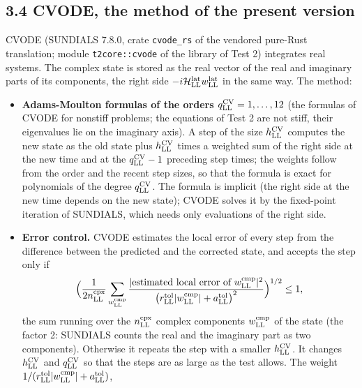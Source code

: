 \documentclass[
  10pt,
]{article}
\providecommand{\tightlist}{%
  \setlength{\itemsep}{0pt}\setlength{\parskip}{0pt}}
\begin{document}
\hypertarget{cvode-the-method-of-the-present-version}{%
\subsection{3.4 CVODE, the method of the present
version}\label{cvode-the-method-of-the-present-version}}

CVODE (SUNDIALS 7.8.0, crate \texttt{cvode\_rs} of the vendored
pure-Rust translation; module \texttt{t2core::cvode} of the library of
Test 2) integrates real systems. The complex state is stored as the real
vector of the real and imaginary parts of its components, the right side
\(-i\mathcal H^{\rm lat}_{\rm LL}w^{\rm lat}_{\rm LL}\) in the same way.
The method:

\begin{itemize}
\tightlist
\item
  \textbf{Adams-Moulton formulas of the orders
  \(q^{\rm CV}_{\rm LL}=1,\dots,12\)} (the formulas of CVODE for
  nonstiff problems; the equations of Test 2 are not stiff, their
  eigenvalues lie on the imaginary axis). A step of the size
  \(h^{\rm CV}_{\rm LL}\) computes the new state as the old state plus
  \(h^{\rm CV}_{\rm LL}\) times a weighted sum of the right side at the
  new time and at the \(q^{\rm CV}_{\rm LL}-1\) preceding step times;
  the weights follow from the order and the recent step sizes, so that
  the formula is exact for polynomials of the degree
  \(q^{\rm CV}_{\rm LL}\). The formula is implicit (the right side at
  the new time depends on the new state); CVODE solves it by the
  fixed-point iteration of SUNDIALS, which needs only evaluations of the
  right side.
\item
  \textbf{Error control.} CVODE estimates the local error of every step
  from the difference between the predicted and the corrected state, and
  accepts the step only if
  \[\Big(\frac{1}{2n^{\rm cpx}_{\rm LL}}\sum_{w^{\rm cmp}_{\rm LL}}\frac{\lvert\text{estimated local error of }w^{\rm cmp}_{\rm LL}\rvert^2}{\big(r^{\rm tol}_{\rm LL}\lvert w^{\rm cmp}_{\rm LL}\rvert+a^{\rm tol}_{\rm LL}\big)^2}\Big)^{1/2}\le1,\]
  the sum running over the \(n^{\rm cpx}_{\rm LL}\) complex components
  \(w^{\rm cmp}_{\rm LL}\) of the state (the factor 2: SUNDIALS counts
  the real and the imaginary part as two components). Otherwise it
  repeats the step with a smaller \(h^{\rm CV}_{\rm LL}\). It changes
  \(h^{\rm CV}_{\rm LL}\) and \(q^{\rm CV}_{\rm LL}\) so that the steps
  are as large as the test allows. The weight
  \(1/(r^{\rm tol}_{\rm LL}\lvert w^{\rm cmp}_{\rm LL}\rvert+a^{\rm tol}_{\rm LL})\),

\end{itemize}
\end{document}
